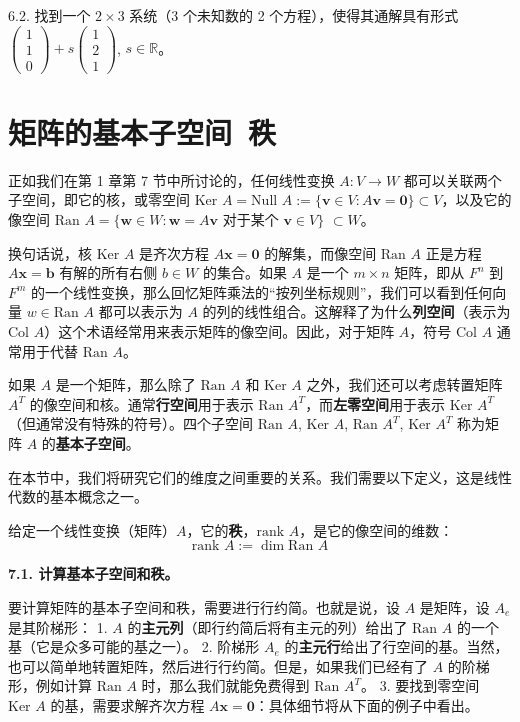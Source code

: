 6.2. 找到一个 $2 \times 3$ 系统（3 个未知数的 2 个方程），使得其通解具有形式 $\begin{pmatrix} 1 \\ 1 \\ 0 \end{pmatrix} + s \begin{pmatrix} 1 \\ 2 \\ 1 \end{pmatrix}$, $s \in \mathbb{R}$。


\section{矩阵的基本子空间~秩}

正如我们在第 1 章第 7 节中所讨论的，任何线性变换 $A: V \to W$ 都可以关联两个子空间，即它的核，或零空间 $\text{Ker } A = \text{Null } A := \{ \mathbf{v} \in V : A \mathbf{v} = \mathbf{0} \} \subset V$，以及它的像空间 $\text{Ran } A = \{ \mathbf{w} \in W : \mathbf{w} = A \mathbf{v} \text{ 对于某个 } \mathbf{v} \in V \}$ $\subset W$。

换句话说，核 $\text{Ker } A$ 是齐次方程 $A \mathbf{x} = \mathbf{0}$ 的解集，而像空间 $\text{Ran } A$ 正是方程 $A \mathbf{x} = \mathbf{b}$ 有解的所有右侧 $b \in W$ 的集合。如果 $A$ 是一个 $m \times n$ 矩阵，即从 $F^n$ 到 $F^m$ 的一个线性变换，那么回忆矩阵乘法的“按列坐标规则”，我们可以看到任何向量 $w \in \text{Ran } A$ 都可以表示为 $A$ 的列的线性组合。这解释了为什么\textbf{列空间}（表示为 $\text{Col } A$）这个术语经常用来表示矩阵的像空间。因此，对于矩阵 $A$，符号 $\text{Col } A$ 通常用于代替 $\text{Ran } A$。

如果 $A$ 是一个矩阵，那么除了 $\text{Ran } A$ 和 $\text{Ker } A$ 之外，我们还可以考虑转置矩阵 $A^T$ 的像空间和核。通常\textbf{行空间}用于表示 $\text{Ran } A^T$，而\textbf{左零空间}用于表示 $\text{Ker } A^T$（但通常没有特殊的符号）。四个子空间 $\text{Ran } A$, $\text{Ker } A$, $\text{Ran } A^T$, $\text{Ker } A^T$ 称为矩阵 $A$ 的\textbf{基本子空间}。

在本节中，我们将研究它们的维度之间重要的关系。我们需要以下定义，这是线性代数的基本概念之一。

\begin{definition} 给定一个线性变换（矩阵）$A$，它的\textbf{秩}，$\text{rank } A$，是它的像空间的维数：
$$
\text{rank } A := \dim \text{Ran } A
$$
\end{definition}

\textbf{7.1. 计算基本子空间和秩。}

要计算矩阵的基本子空间和秩，需要进行行约简。也就是说，设 $A$ 是矩阵，设 $A_e$ 是其阶梯形：
1. $A$ 的\textbf{主元列}（即行约简后将有主元的列）给出了 $\text{Ran } A$ 的一个基（它是众多可能的基之一）。
2. 阶梯形 $A_e$ 的\textbf{主元行}给出了行空间的基。当然，也可以简单地转置矩阵，然后进行行约简。但是，如果我们已经有了 $A$ 的阶梯形，例如计算 $\text{Ran } A$ 时，那么我们就能免费得到 $\text{Ran } A^T$。
3. 要找到零空间 $\text{Ker } A$ 的基，需要求解齐次方程 $A \mathbf{x} = \mathbf{0}$：具体细节将从下面的例子中看出。

